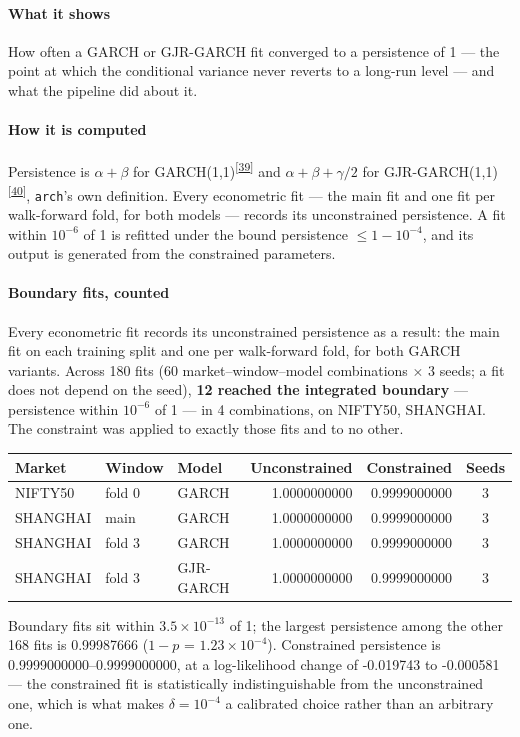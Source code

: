 \documentclass[11pt,a4paper]{article}
\makeatletter
\newcommand{\tcite}[1]{\textsuperscript{[\hyperlink{R:#1}{#1}]}}
\DeclareRobustCommand{\_}{\ifmmode\nfss@text{\textunderscore}\else\textunderscore\allowbreak\fi}
\makeatother
\begin{document}
\paragraph{What it shows} How often a GARCH or GJR-GARCH fit converged to a persistence of 1 --- the point at which the conditional variance never reverts to a long-run level --- and what the pipeline did about it.

\paragraph{How it is computed} Persistence is $\alpha+\beta$ for GARCH(1,1)\tcite{39} and $\alpha+\beta+\gamma/2$ for GJR-GARCH(1,1)\tcite{40}, \texttt{arch}'s own definition. Every econometric fit --- the main fit and one fit per walk-forward fold, for both models --- records its unconstrained persistence. A fit within $10^{-6}$ of 1 is refitted under the bound persistence $\le 1-10^{-4}$, and its output is generated from the constrained parameters.

\paragraph{Boundary fits, counted} Every econometric fit records its unconstrained persistence as a result: the main fit on each training split and one per walk-forward fold, for both GARCH variants. Across 180 fits (60 market--window--model combinations $\times$ 3 seeds; a fit does not depend on the seed), \textbf{12 reached the integrated boundary} --- persistence within $10^{-6}$ of 1 --- in 4 combinations, on NIFTY50, SHANGHAI. The constraint was applied to exactly those fits and to no other.

\smallskip
{\footnotesize
\begin{tabular}{@{}lllrrc@{}}
\toprule
Market & Window & Model & Unconstrained & Constrained & Seeds \\
\midrule
NIFTY50 & fold 0 & GARCH & 1.0000000000 & 0.9999000000 & 3 \\
SHANGHAI & main & GARCH & 1.0000000000 & 0.9999000000 & 3 \\
SHANGHAI & fold 3 & GARCH & 1.0000000000 & 0.9999000000 & 3 \\
SHANGHAI & fold 3 & GJR-GARCH & 1.0000000000 & 0.9999000000 & 3 \\
\bottomrule
\end{tabular}}

\smallskip
Boundary fits sit within $3.5\times10^{-13}$ of 1; the largest persistence among the other 168 fits is 0.99987666 ($1-p$ = $1.23\times10^{-4}$). Constrained persistence is 0.9999000000--0.9999000000, at a log-likelihood change of -0.019743 to -0.000581 --- the constrained fit is statistically indistinguishable from the unconstrained one, which is what makes $\delta=10^{-4}$ a calibrated choice rather than an arbitrary one.
\end{document}
